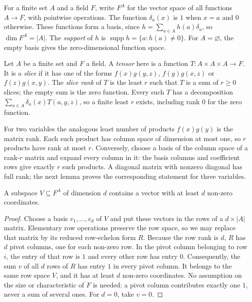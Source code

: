 For a finite set $A$ and a field $F$, write $F^A$ for the vector space of
all functions $A\to F$, with pointwise operations. The function
$\delta_a(x)$ is $1$ when $x=a$ and $0$ otherwise. These functions form
a basis, since $h=\sum_{a\in A}h(a)\delta_a$, so $\dim F^A=|A|$.
The \emph{support} of $h$ is $\operatorname{supp}h=\{a:h(a)\ne0\}$.
For $A=\varnothing$, the empty basis gives the zero-dimensional function space.

\begin{definition}\label{combinatorial:def:slicerank}
Let $A$ be a finite set and $F$ a field. A \emph{tensor} here is a function $T:A\times A\times A\to F$. It is a \emph{slice} if it has one of the forms $f(x)g(y,z)$, $f(y)g(x,z)$ or $f(z)g(x,y)$. The \emph{slice rank} of $T$ is the least $r$ such
that $T$ is a sum of $r\ge0$ slices; the empty sum is the zero function.
Every such $T$ has a decomposition $\sum_{a\in A}\delta_a(x)T(a,y,z)$,
so a finite least $r$ exists, including rank $0$ for the zero function.
\end{definition}

For two variables the analogous least number of products $f(x)g(y)$ is the
matrix rank. Each such product has column space of dimension at most one,
so $r$ products have rank at most $r$. Conversely, choose a basis of the
column space of a rank-$r$ matrix and expand every column in it: the basis
columns and coefficient rows give exactly $r$ such products.
A diagonal matrix with nonzero diagonal has full rank; the next lemma proves
the corresponding statement for three variables.

\begin{lemma}\label{combinatorial:lem:support}
A subspace $V\subseteq F^A$ of dimension $d$ contains a vector with at least $d$ non-zero coordinates.
\end{lemma}
\begin{proof}
Choose a basis $v_1,\ldots,v_d$ of $V$ and put
these vectors in the rows of a $d\times|A|$ matrix.
Elementary row operations preserve the row space,
so we may replace that matrix by its reduced
row-echelon form $R$. Because the row rank is $d$,
$R$ has $d$ pivot columns, one for each non-zero row.
In the pivot column belonging to row $i$, the entry
of that row is $1$ and every other row has entry $0$.
Consequently, the sum $v$ of all $d$ rows of $R$
has entry $1$ in every pivot column. It belongs
to the same row space $V$, and it has at least
$d$ non-zero coordinates. No assumption on the
size or characteristic of $F$ is needed: a pivot
column contributes exactly one $1$, never a sum
of several ones. For $d=0$, take $v=0$.
\end{proof}

